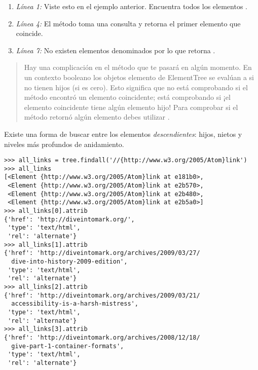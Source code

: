\begin{enumerate}

\item \emph{Línea 1:} Viste esto en el ejemplo anterior. Encuentra todos los elementos .

\item \emph{Línea 4:} El método  toma una consulta y retorna el primer elemento que coincide.

\item \emph{Línea 7:} No existen elementos denominados  por lo que retorna .

\end{enumerate}

\begin{quote}
Hay una complicación en el método  que te pasará en algún momento. En un contexto booleano los objetos elemento de ElementTree se evalúan a  si no tienen hijos (si  es cero). Esto significa que  no está comprobando si el método  encontró un elemento coincidente; está comprobando si ¡el elemento coincidente tiene algún elemento hijo! Para comprobar si el método  retornó algún elemento debes utilizar .
\end{quote}

Existe una forma de buscar entre los elementos \emph{descendientes}: hijos, nietos y niveles más profundos de anidamiento.

\noindent\begin{minipage}{\textwidth}
\begin{lstlisting}[mathescape=True]
>>> all_links = tree.findall('//{http://www.w3.org/2005/Atom}link')
>>> all_links
[<Element {http://www.w3.org/2005/Atom}link at e181b0>,
 <Element {http://www.w3.org/2005/Atom}link at e2b570>,
 <Element {http://www.w3.org/2005/Atom}link at e2b480>,
 <Element {http://www.w3.org/2005/Atom}link at e2b5a0>]
>>> all_links[0].attrib
{'href': 'http://diveintomark.org/',
 'type': 'text/html',
 'rel': 'alternate'}
>>> all_links[1].attrib
{'href': 'http://diveintomark.org/archives/2009/03/27/
  dive-into-history-2009-edition',
 'type': 'text/html',
 'rel': 'alternate'}
>>> all_links[2].attrib
{'href': 'http://diveintomark.org/archives/2009/03/21/
  accessibility-is-a-harsh-mistress',
 'type': 'text/html',
 'rel': 'alternate'}
>>> all_links[3].attrib
{'href': 'http://diveintomark.org/archives/2008/12/18/
  give-part-1-container-formats',
 'type': 'text/html',
 'rel': 'alternate'}
\end{lstlisting}
\end{minipage}

